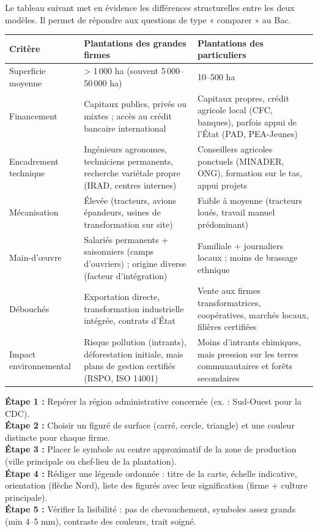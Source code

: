\documentclass[11pt]{article}
\newcounter{popsec}
\newcounter{popsub}
\newcommand{\courssub}[1]{%
  \stepcounter{popsub}%
  \par\vspace{9pt}\noindent{\popxbold\fontsize{11.5}{13}\selectfont\color{popink}{\color{poporange}\thepopsec.\thepopsub}\hspace{6pt}#1}\par\nopagebreak\vspace{4pt}
}
\begin{document}
\courssub{Comparaison des deux types}

Le tableau suivant met en évidence les différences structurelles entre les deux modèles. Il permet de répondre aux questions de type « comparer » au Bac.

\begin{center}
\begin{tabularx}{\linewidth}{|l|X|X|}
\hline
\rowcolor{popblueL}
\textbf{Critère} & \textbf{Plantations des grandes firmes} & \textbf{Plantations des particuliers} \\ \hline
Superficie moyenne & > 1\,000 ha (souvent 5\,000--50\,000 ha) & 10--500 ha \\ \hline
Financement & Capitaux publics, privés ou mixtes ; accès au crédit bancaire international & Capitaux propres, crédit agricole local (CFC, banques), parfois appui de l'État (PAD, PEA-Jeunes) \\ \hline
Encadrement technique & Ingénieurs agronomes, techniciens permanents, recherche variétale propre (IRAD, centres internes) & Conseillers agricoles ponctuels (MINADER, ONG), formation sur le tas, appui projets \\ \hline
Mécanisation & Élevée (tracteurs, avions épandeurs, usines de transformation sur site) & Faible à moyenne (tracteurs loués, travail manuel prédominant) \\ \hline
Main-d'œuvre & Salariés permanents + saisonniers (camps d'ouvriers) ; origine diverse (facteur d'intégration) & Familiale + journaliers locaux ; moins de brassage ethnique \\ \hline
Débouchés & Exportation directe, transformation industrielle intégrée, contrats d'État & Vente aux firmes transformatrices, coopératives, marchés locaux, filières certifiées \\ \hline
Impact environnemental & Risque pollution (intrants), déforestation initiale, mais plans de gestion certifiés (RSPO, ISO 14001) & Moins d'intrants chimiques, mais pression sur les terres communautaires et forêts secondaires \\ \hline
\end{tabularx}
\end{center}

\begin{methode}
\textbf{Étape 1 :} Repérer la région administrative concernée (ex. : Sud-Ouest pour la CDC). \\
\textbf{Étape 2 :} Choisir un figuré de surface (carré, cercle, triangle) et une couleur distincte pour chaque firme. \\
\textbf{Étape 3 :} Placer le symbole au centre approximatif de la zone de production (ville principale ou chef-lieu de la plantation). \\
\textbf{Étape 4 :} Rédiger une légende ordonnée : titre de la carte, échelle indicative, orientation (flèche Nord), liste des figurés avec leur signification (firme + culture principale). \\
\textbf{Étape 5 :} Vérifier la lisibilité : pas de chevauchement, symboles assez grands (min 4--5 mm), contraste des couleurs, trait soigné.
\end{methode}
\end{document}
